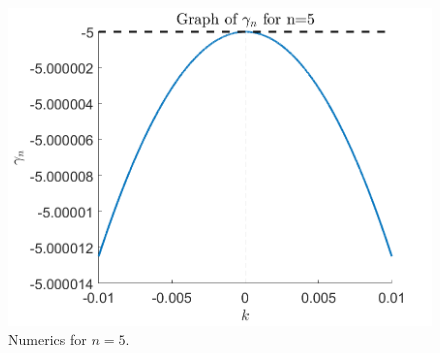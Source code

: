 \documentclass[]{article}
\begin{document}
	\begin{figure}
		\centering
		\includegraphics[width = .5\textwidth]{../Numerics/Images/gamma_n5}
		\caption{Numerics for $n = 5$.}
	\end{figure}
	
\end{document}
